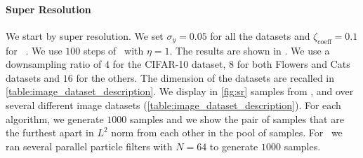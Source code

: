 \paragraph*{Super Resolution}
%
We start by super resolution.
We set $\sigma_y = 0.05$ for all the datasets
and $\zeta_{\mathrm{coeff}} = 0.1$ for \dps\ . We use $100$ steps of \ddim\ with $\eta=1$. The results are shown in .
We use a downsampling ratio of $4$ for the CIFAR-10 dataset, $8$ for both Flowers and Cats datasets and $16$ for the others.
The dimension of the datasets are recalled in \cref{table:image_dataset_description}.
We display in \cref{fig:sr} samples from \algo, \dps and \ddrm over several different image datasets (\cref{table:image_dataset_description}).
For each algorithm, we
generate $1000$ samples and we show the pair of samples that are the furthest apart in $L^2$ norm from each other in the pool of samples.
For \algo\ we ran several parallel particle filters with $N=64$ to generate $1000$ samples.
%
